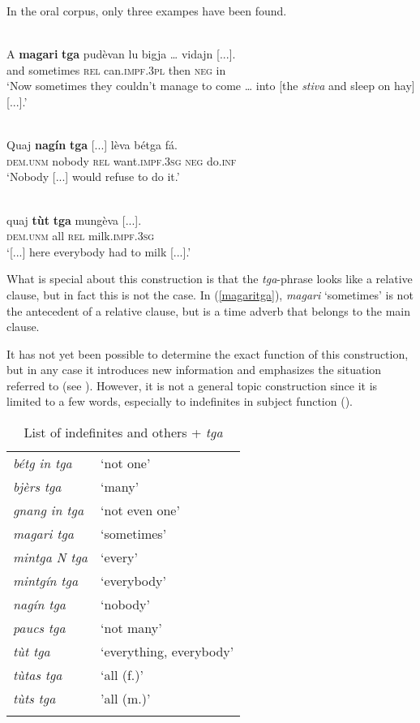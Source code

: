 In the oral corpus, only three exampes have been found.

\ea
\label{magaritga}
\\
\gll A  \textbf{magari} \textbf{tga} pudèvan lu bigja … vidajn [...]. \\
and sometimes \textsc{rel} can.\textsc{impf.3pl} then \textsc{neg} {} in\\
\glt `Now sometimes they couldn’t manage to come … into [the \textit{stiva} and sleep on hay] [...].'
\z

\ea
\label{}
\\
	\gll Quaj \textbf{nagín} \textbf{tga} [...] lèva bétga fá.\\
	 \textsc{dem.unm} nobody \textsc{rel} {}  want.\textsc{impf.3sg} \textsc{neg} do.\textsc{inf}\\
\glt `Nobody [...] would refuse to do it.'
\z

\ea
\label{}
\\
	\gll [...] quaj \textbf{tùt} \textbf{tga} mungèva [...].  \\
{} \textsc{dem.unm} all \textsc{rel} milk.\textsc{impf.3sg}\\
\glt `[...] here everybody had to milk [...].'
\z

What is special about this construction is that the \textit{tga}-phrase looks like a relative clause, but in fact this is not the case. In (\ref{magaritga}), \textit{magari} `sometimes' is not the antecedent of a relative clause, but is a time adverb that belongs to the main clause.

It has not yet been possible to determine the exact function of this construction, but in any case it introduces new information and emphasizes the situation referred to (see \citet[195-198]{Linder1987}). However, it is not a general topic construction since it is limited to a few words, especially to indefinites in subject function ().

\begin{table}
	\caption{List of indefinites and others + \textit{tga}}
	\label{indefinitetga}
	\begin{tabular}{ll}
		\lsptoprule
				\textit{bétg in tga} & `not one'\\
		\textit{bjèrs tga} & `many'\\
		\textit{gnang in tga} & `not even one'\\
		\textit{magari tga} & `sometimes'\\
		\textit{mintga N tga} & `every'\\
		\textit{mintgín tga} & `everybody'\\
		\textit{nagín tga} & `nobody'\\
		\textit{paucs tga} & `not many'\\
		\textit{tùt tga} & `everything, everybody'\\
		\textit{tùtas tga} & `all (f.)'\\
		\textit{tùts tga} & 'all (m.)'\\
		\lspbottomrule
	\end{tabular}
\end{table}

